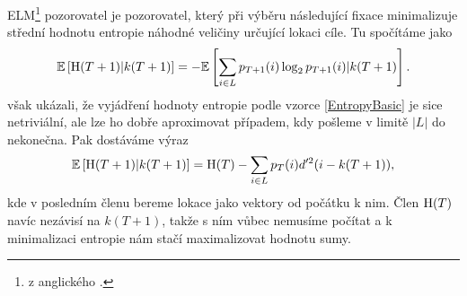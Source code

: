 ELM\footnote{z anglického .} pozorovatel je
pozorovatel, který při výběru následující fixace minimalizuje střední hodnotu
entropie náhodné veličiny určující lokaci cíle. Tu spočítáme jako
\begin{equation}\label{EntropyBasic}\mathbb{E}\left[\operatorname{H}(T+1)|k(T+1)\right]=-\mathbb{E}\left[\displaystyle\sum_{i\in
L}p_{T+1}(i)\log_2p_{T+1}(i)|k(T+1)\right].\end{equation} \citet{Najemnik09} však ukázali,
že vyjádření hodnoty entropie podle vzorce \eqref{EntropyBasic} je sice
netriviální, ale lze ho dobře aproximovat případem, kdy pošleme v limitě $|L|$
do nekonečna. Pak dostáváme výraz $$ \mathbb{E}\left[\operatorname{H}(T+1)|k(T+1)\right]= \operatorname{H}(T) -
\displaystyle\sum_{i\in L} p_T(i)d'^2(i-k(T+1)),$$ kde v posledním členu bereme
lokace jako vektory od počátku k nim. Člen $\operatorname{H}(T)$ navíc nezávisí na $k(T+1)$,
takže s ním vůbec nemusíme počítat a k minimalizaci entropie nám stačí
maximalizovat hodnotu sumy. 

